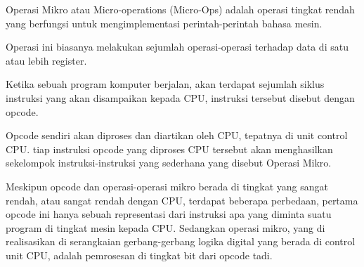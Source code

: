 Operasi Mikro atau Micro-operations (Micro-Ops) adalah operasi tingkat rendah
yang berfungsi untuk mengimplementasi perintah-perintah bahasa mesin.

Operasi ini biasanya melakukan sejumlah operasi-operasi terhadap data di satu
atau lebih register.

Ketika sebuah program komputer berjalan, akan terdapat sejumlah siklus instruksi yang akan
disampaikan kepada CPU, instruksi tersebut disebut dengan opcode.

Opcode sendiri akan diproses dan diartikan oleh CPU, tepatnya di unit control CPU.
tiap instruksi opcode yang diproses CPU tersebut akan menghasilkan sekelompok
instruksi-instruksi yang sederhana yang disebut Operasi Mikro.

Meskipun opcode dan operasi-operasi mikro berada di tingkat yang sangat rendah,
atau sangat rendah dengan CPU, terdapat beberapa perbedaan, pertama opcode ini
hanya sebuah representasi dari instruksi apa yang diminta suatu program di
tingkat mesin kepada CPU. Sedangkan operasi mikro, yang di realisasikan
di serangkaian gerbang-gerbang logika digital yang berada di control unit CPU,
adalah pemrosesan di tingkat bit dari opcode tadi.
